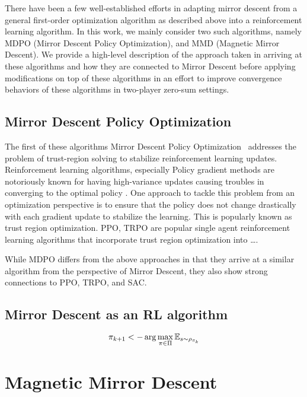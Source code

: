 There have been a few well-established efforts in adapting mirror descent from a general
first-order optimization algorithm as described above into a reinforcement learning algorithm.
In this work, we mainly consider two such algorithms, namely MDPO (Mirror Descent Policy
Optimization), and MMD (Magnetic Mirror Descent).
We provide a high-level description of the approach taken in arriving at these algorithms and how
they are connected to Mirror Descent before applying modifications on top of these algorithms in an
effort to improve convergence behaviors of these algorithms in two-player zero-sum settings.

\subsection[MDPO]{Mirror Descent Policy Optimization}

The first of these algorithms Mirror Descent Policy Optimization~\cite{tomarMirror2022} addresses
the problem of trust-region solving to stabilize reinforcement learning updates.
Reinforcement learning algorithms, especially Policy gradient methods are notoriously known for
having high-variance updates causing troubles in converging to the optimal policy .
One approach to tackle this problem from an optimization perspective is to ensure that the policy
does not change drastically with each gradient update to stabilize the learning.
This is popularly known as trust region optimization.
PPO, TRPO are popular single agent reinforcement learning algorithms that incorporate trust region
optimization into \dots {}.
\cite{schulmanProximal2017}

While MDPO differs from the above approaches in that they arrive at a similar algorithm from the
perspective of Mirror Descent, they also show strong connections to PPO, TRPO, and SAC.

\subsection{Mirror Descent as an RL algorithm}

$$ \pi_{k+1} <- \arg \max_{\pi \in \Pi} \mathbb{E}_{s \sim \rho_{\pi_k}} $$

\section[MMD]{Magnetic Mirror Descent}


